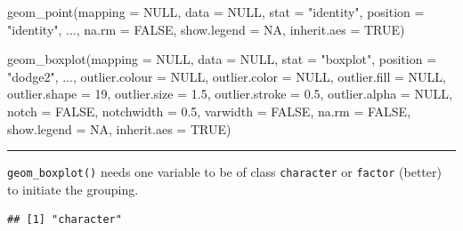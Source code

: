 \documentclass[]{book}
\newenvironment{Shaded}{}{}
\newcommand{\DataTypeTok}[1]{#1}
\newcommand{\DecValTok}[1]{#1}
\newcommand{\FloatTok}[1]{#1}
\newcommand{\KeywordTok}[1]{\textcolor[rgb]{0.00,0.00,1.00}{#1}}
\newcommand{\NormalTok}[1]{#1}
\newcommand{\OperatorTok}[1]{#1}
\newcommand{\OtherTok}[1]{\textcolor[rgb]{1.00,0.25,0.00}{#1}}
\newcommand{\StringTok}[1]{\textcolor[rgb]{0.00,0.50,0.50}{#1}}
\begin{document}
\begin{Shaded}
\begin{Highlighting}[]
\KeywordTok{geom_point}\NormalTok{(}\DataTypeTok{mapping =} \OtherTok{NULL}\NormalTok{, }\DataTypeTok{data =} \OtherTok{NULL}\NormalTok{, }\DataTypeTok{stat =} \StringTok{"identity"}\NormalTok{,}
  \DataTypeTok{position =} \StringTok{"identity"}\NormalTok{, ..., }\DataTypeTok{na.rm =} \OtherTok{FALSE}\NormalTok{, }\DataTypeTok{show.legend =} \OtherTok{NA}\NormalTok{,}
  \DataTypeTok{inherit.aes =} \OtherTok{TRUE}\NormalTok{)}

\KeywordTok{geom_boxplot}\NormalTok{(}\DataTypeTok{mapping =} \OtherTok{NULL}\NormalTok{, }\DataTypeTok{data =} \OtherTok{NULL}\NormalTok{, }\DataTypeTok{stat =} \StringTok{"boxplot"}\NormalTok{,}
  \DataTypeTok{position =} \StringTok{"dodge2"}\NormalTok{, ..., }\DataTypeTok{outlier.colour =} \OtherTok{NULL}\NormalTok{,}
  \DataTypeTok{outlier.color =} \OtherTok{NULL}\NormalTok{, }\DataTypeTok{outlier.fill =} \OtherTok{NULL}\NormalTok{, }\DataTypeTok{outlier.shape =} \DecValTok{19}\NormalTok{,}
  \DataTypeTok{outlier.size =} \FloatTok{1.5}\NormalTok{, }\DataTypeTok{outlier.stroke =} \FloatTok{0.5}\NormalTok{, }\DataTypeTok{outlier.alpha =} \OtherTok{NULL}\NormalTok{,}
  \DataTypeTok{notch =} \OtherTok{FALSE}\NormalTok{, }\DataTypeTok{notchwidth =} \FloatTok{0.5}\NormalTok{, }\DataTypeTok{varwidth =} \OtherTok{FALSE}\NormalTok{, }\DataTypeTok{na.rm =} \OtherTok{FALSE}\NormalTok{,}
  \DataTypeTok{show.legend =} \OtherTok{NA}\NormalTok{, }\DataTypeTok{inherit.aes =} \OtherTok{TRUE}\NormalTok{)}
\end{Highlighting}
\end{Shaded}

\begin{center}\rule{0.5\linewidth}{\linethickness}\end{center}

\texttt{geom\_boxplot()} needs one variable to be of class \texttt{character} or \texttt{factor} (better) to initiate the grouping.

\begin{Shaded}
\end{Shaded}

\begin{verbatim}
## [1] "character"
\end{verbatim}
\end{document}
